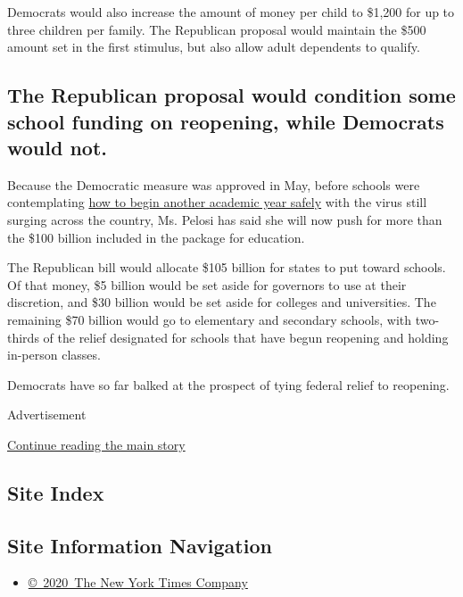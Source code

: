 Democrats would also increase the amount of money per child to \$1,200
for up to three children per family. The Republican proposal would
maintain the \$500 amount set in the first stimulus, but also allow
adult dependents to qualify.

\hypertarget{the-republican-proposal-would-condition-some-school-funding-on-reopening-while-democrats-would-not}{%
\subsection{The Republican proposal would condition some school funding
on reopening, while Democrats would
not.}\label{the-republican-proposal-would-condition-some-school-funding-on-reopening-while-democrats-would-not}}

Because the Democratic measure was approved in May, before schools were
contemplating
\href{https://www.nytimes.com/2020/07/11/health/coronavirus-schools-reopen.html}{how
to begin another academic year safely} with the virus still surging
across the country, Ms. Pelosi has said she will now push for more than
the \$100 billion included in the package for education.

The Republican bill would allocate \$105 billion for states to put
toward schools. Of that money, \$5 billion would be set aside for
governors to use at their discretion, and \$30 billion would be set
aside for colleges and universities. The remaining \$70 billion would go
to elementary and secondary schools, with two-thirds of the relief
designated for schools that have begun reopening and holding in-person
classes.

Democrats have so far balked at the prospect of tying federal relief to
reopening.

Advertisement

\protect\hyperlink{after-bottom}{Continue reading the main story}

\hypertarget{site-index}{%
\subsection{Site Index}\label{site-index}}

\hypertarget{site-information-navigation}{%
\subsection{Site Information
Navigation}\label{site-information-navigation}}

\begin{itemize}
\tightlist
\item
  \href{https://help.nytimes.com/hc/en-us/articles/115014792127-Copyright-notice}{©~2020~The
  New York Times Company}
\end{itemize}


